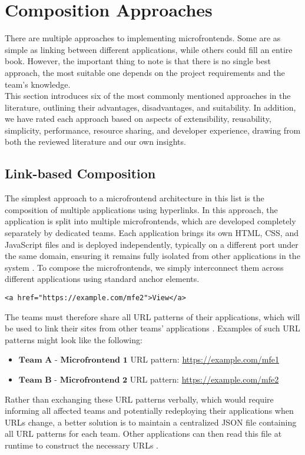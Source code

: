 \section{Composition Approaches}
There are multiple approaches to implementing microfrontends. Some are as simple as linking between different applications, while others could fill an entire book. However, the important thing to note is that there is no single best approach, the most suitable one depends on the project requirements and the team's knowledge. \\

\noindent
This section introduces six of the most commonly mentioned approaches in the literature, outlining their advantages, disadvantages, and suitability. In addition, we have rated each approach based on aspects of extensibility, reusability, simplicity, performance, resource sharing, and developer experience, drawing from both the reviewed literature and our own insights.

\subsection{Link-based Composition}
The simplest approach to a microfrontend architecture in this list is the composition of multiple applications using hyperlinks. In this approach, the application is split into multiple microfrontends, which are developed completely separately by dedicated teams. Each application brings its own HTML, CSS, and JavaScript files and is deployed independently, typically on a different port under the same domain, ensuring it remains fully isolated from other applications in the system \cite{Geers}. To compose the microfrontends, we simply interconnect them across different applications using standard anchor elements.
\begin{verbatim}
<a href="https://example.com/mfe2">View</a>
\end{verbatim}
The teams must therefore share all URL patterns of their applications, which will be used to link their sites from other teams' applications \cite{Geers}. Examples of such URL patterns might look like the following:
\begin{itemize}
\item $\textbf{Team A - Microfrontend 1}$ \newline
URL pattern: \url{https://example.com/mfe1}
\item $\textbf{Team B - Microfrontend 2}$ \newline
URL pattern: \url{https://example.com/mfe2}
\end{itemize}
Rather than exchanging these URL patterns verbally, which would require informing all affected teams and potentially redeploying their applications when URLs change, a better solution is to maintain a centralized JSON file containing all URL patterns for each team. Other applications can then read this file at runtime to construct the necessary URLs \cite{Geers}. 

